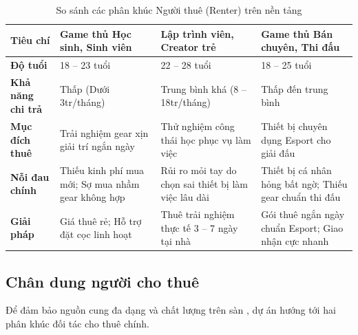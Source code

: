 \begin{table}[H]
    \centering
    \caption{So sánh các phân khúc Người thuê (Renter) trên nền tảng}
    \label{tab:renter-icp}
    \small
    \begin{tabular}{p{3.5cm}p{3.5cm}p{3.5cm}p{3.5cm}}
        \toprule
        \textbf{Tiêu chí} & \textbf{Game thủ Học sinh, Sinh viên} & \textbf{Lập trình viên, Creator trẻ} & \textbf{Game thủ Bán chuyên, Thi đấu} \\
        \midrule
        \textbf{Độ tuổi} & 18 -- 23 tuổi & 22 -- 28 tuổi & 18 -- 25 tuổi \\
        \textbf{Khả năng chi trả} & Thấp (Dưới 3tr/tháng) & Trung bình khá (8 -- 18tr/tháng) & Thấp đến trung bình \\
        \textbf{Mục đích thuê} & Trải nghiệm gear xịn giải trí ngắn ngày & Thử nghiệm công thái học phục vụ làm việc & Thiết bị chuyên dụng Esport cho giải đấu \\
        \textbf{Nỗi đau chính} & Thiếu kinh phí mua mới; Sợ mua nhầm gear không hợp & Rủi ro mỏi tay do chọn sai thiết bị làm việc lâu dài & Thiết bị cá nhân hỏng bất ngờ; Thiếu gear chuẩn thi đấu \\
        \textbf{Giải pháp \projectname{}} & Giá thuê rẻ; Hỗ trợ đặt cọc linh hoạt & Thuê trải nghiệm thực tế 3 -- 7 ngày tại nhà & Gói thuê ngắn ngày chuẩn Esport; Giao nhận cực nhanh \\
        \bottomrule
    \end{tabular}
\end{table}

\subsection{Chân dung người cho thuê}

Để đảm bảo nguồn cung đa dạng và chất lượng trên sàn \projectname{}, dự án hướng tới hai phân khúc đối tác cho thuê chính.

